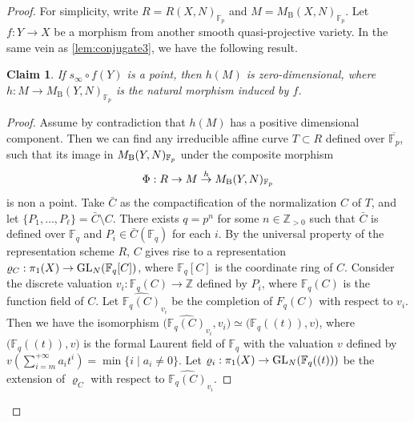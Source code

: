 \documentclass[english]{amsproc}
\theoremstyle{plain}
\newtheorem{claim}[thm]{Claim}
\theoremstyle{definition}
\theoremstyle{remark}
\theoremstyle{plain}
\numberwithin{equation}{thm} %
\newcommand{\bF}{\mathbb{F}}
\newcommand{\bZ}{\mathbb{Z}}
\newcommand{\GL}{{\rm GL}}
\begin{document}
\begin{proof}
For simplicity, write \(R = R(X,N)_{\mathbb{F}_p}\) and \(M = M_{\mathrm{B}}(X,N)_{\mathbb{F}_p}\).
Let \(f:Y \to X\) be a morphism from another smooth quasi-projective variety. In the same vein as \cref{lem:conjugate3}, we have the following result.
\begin{claim}\label{claim:zero}
	If \(s_\infty \circ f(Y)\) is a point, then \(h(M)\) is zero-dimensional, where 
	\(h : M \to M_{\mathrm{B}}(Y,N)_{\mathbb{F}_p}\) is the natural morphism induced by \(f\).
\end{claim}
	\begin{proof} 
		Assume by contradiction that $h(M)$ has a positive dimensional component.  Then we can find  any irreducible affine curve $T\subset R$ defined over $\overline{\bF_p}$, such that its image in  $M_{\rm B}(Y ,N)_{\bF_p}$  under the composite morphism $$\Phi:R\to M\stackrel{h}{\to} M_{\rm B}(Y,N)_{\bF_p}$$
		is non a point. 	Take $\bar{C}$ as the compactification of the normalization $C$ of $T$, and let $\{P_1,\ldots,P_\ell\}= \bar{C}\setminus C$.  
		There exists $q=p^n$ for some $n\in \bZ_{>0}$ such that $\bar{C}$ is defined over $\bF_q$ and $P_i\in \bar{C}(\bF_q)$ for each $i$. 
		By the universal property of the representation scheme $R$, $C$ gives rise to a representation $\varrho_C:\pi_1(X)\to \GL_N(\bF_q[C])$, where $\bF_q[C]$ is the coordinate ring of $C$. 
		Consider the discrete valuation $v_i:\bF_q(C)\to \bZ$ defined by $P_i$, where $\bF_q(C)$ is the function field of $C$. 
		Let $\widehat{\bF_q(C)}_{v_i}$  be the completion of $F_{q}(C)$ with respect to $v_i$.  Then we have the isomorphism $\big(\widehat{\bF_q(C)}_{v_i},v_i\big)\simeq \big(\bF_q((t)),v\big)$, where $ \big(\bF_q((t)),v\big)$ is the formal Laurent field of $\bF_q$ with the valuation $v$ defined by  $v(\sum_{i=m}^{+\infty}a_it^i)=\min \{i\mid a_i\neq 0\}$.    
		Let $\varrho_i:\pi_1(X)\to \GL_N(\bF_q((t)))$  be the extension of $\varrho_C$ with respect to $\widehat{\bF_q(C)}_{v_i}$.  
		

\end{proof}
\end{proof}
\end{document}
